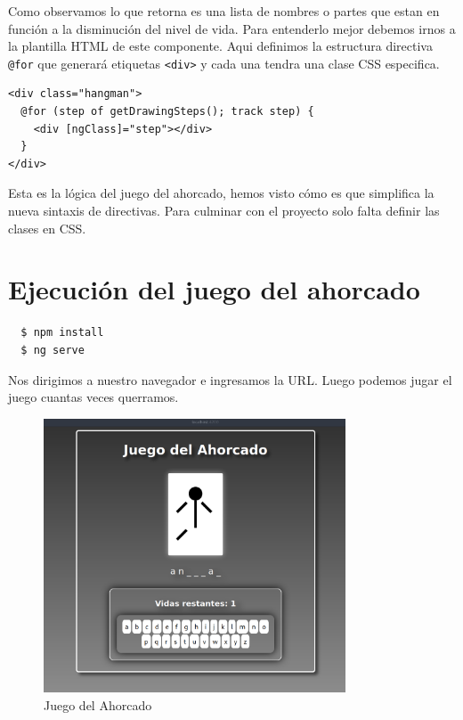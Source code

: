 \documentclass[10pt, a4paper]{article}
\newcommand{\mts}[1]{\texttt{#1}}
\begin{document}
Como observamos lo que retorna es una lista de nombres o partes que estan en función a la disminución del nivel de vida. Para entenderlo mejor debemos irnos a la plantilla HTML de este componente. Aqui definimos la estructura directiva \mts{@for} que generará etiquetas \mts{<div>} y cada una tendra una clase CSS especifica.

\begin{verbatim}
<div class="hangman">
  @for (step of getDrawingSteps(); track step) {
    <div [ngClass]="step"></div>
  }
</div>
\end{verbatim}

Esta es la lógica del juego del ahorcado, hemos visto cómo es que simplifica la nueva sintaxis de directivas. Para culminar con el proyecto solo falta definir las clases en CSS.

\section{Ejecución del juego del ahorcado}

\begin{verbatim}
  $ npm install
  $ ng serve
\end{verbatim}

Nos dirigimos a nuestro navegador e ingresamos la URL. Luego podemos jugar el juego cuantas veces querramos.

\begin{figure}[H]
  \centering
  \includegraphics[width=0.8\textwidth]{img/juego_ahorcado.png}
  \caption{Juego del Ahorcado}
\end{figure}
\end{document}

